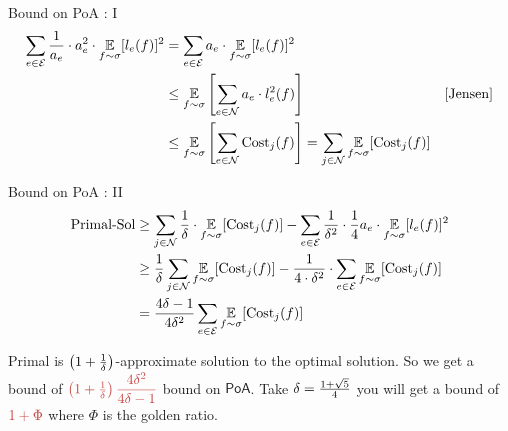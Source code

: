 \documentclass[aspectratio=1610]{beamer}
\begin{document}
\begin{frame}{Bound on \textsf{PoA} : I}
    \vspace*{-8mm}
    \begin{align*}
        \sum_{e\in \mathcal{E}} \frac1{ a_e}\cdot a_e^2\cdot \underset{f\sim \sigma}{\mathbb{E}}[l_e(f)]^2 & = \sum_{e\in \mathcal{E}}  a_e\cdot\underset{f\sim \sigma}{\mathbb{E}}[l_e(f)]^2 \\
        & \leq \underset{f\sim \sigma}{\mathbb{E}}\left[ \sum_{e\in\mathcal{N}} a_e\cdot l_e^2(f)  \right]& [\text{Jensen}]\\
        & \leq \underset{f\sim \sigma}{\mathbb{E}}\left[ \sum_{e\in\mathcal{N}} \text{Cost}_j(f)\right] =\sum_{j\in\mathcal{N}}\underset{f\sim \sigma}{\mathbb{E}}[\text{Cost}_j(f)]
    \end{align*}
\end{frame}
\begin{frame}{Bound on \textsf{PoA} : II}
    \begin{align*}
        \text{Primal-Sol} & \geq \sum\limits_{j\in \mathcal{N}}\frac1{\delta}\cdot \underset{f\sim \sigma}{\mathbb{E}}[\text{Cost}_j(f)]-\sum_{e\in \mathcal{E}}\frac1{\delta^2}\cdot \frac1{4}a_e\cdot \underset{f\sim \sigma}{\mathbb{E}}[l_e(f)]^2\\
        & \geq  \frac{1}{\delta}\sum_{j\in\mathcal{N}}\underset{f\sim \sigma}{\mathbb{E}}[\text{Cost}_j(f)]-\frac1{4\cdot \delta^2}\cdot \sum_{e\in \mathcal{E}}\underset{f\sim \sigma}{\mathbb{E}}[\text{Cost}_j(f)]\\
        & = \frac{4\delta-1}{4\delta^2}\sum_{e\in \mathcal{E}}\underset{f\sim \sigma}{\mathbb{E}}[\text{Cost}_j(f)]
    \end{align*}\pause

Primal is $\left(1+\frac1{\delta}\right)$-approximate solution to the optimal solution. So we get a bound of $\mathcolor{myr}{\lt(1+\frac1{\dl}\rt)\dfrac{4\dl^2}{4\dl-1}}$ bound on $\textsf{PoA}$.  Take $\delta=\frac{1+\sqrt{5}}{4}$ you will get a bound of $\mathcolor{myr}{1+\Phi}$ where $\Phi$ is the golden ratio.
\end{frame}
\end{document}
